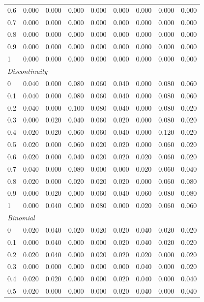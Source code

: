 \begin{table}[htbp]
\begin{tabular}{lcccccccc}
0.6 & 0.000 & 0.000 & 0.000 & 0.000 & 0.000 & 0.000 & 0.000 & 0.000 \\
0.7 & 0.000 & 0.000 & 0.000 & 0.000 & 0.000 & 0.000 & 0.000 & 0.000 \\
0.8 & 0.000 & 0.000 & 0.000 & 0.000 & 0.000 & 0.000 & 0.000 & 0.000 \\
0.9 & 0.000 & 0.000 & 0.000 & 0.000 & 0.000 & 0.000 & 0.000 & 0.000 \\
1 & 0.000 & 0.000 & 0.000 & 0.000 & 0.000 & 0.000 & 0.000 & 0.000 \\
\midrule
\multicolumn{9}{l}{\textit{Discontinuity}} \\
0 & 0.040 & 0.000 & 0.080 & 0.060 & 0.040 & 0.000 & 0.080 & 0.060 \\
0.1 & 0.040 & 0.000 & 0.080 & 0.060 & 0.040 & 0.000 & 0.080 & 0.060 \\
0.2 & 0.040 & 0.000 & 0.100 & 0.080 & 0.040 & 0.000 & 0.080 & 0.020 \\
0.3 & 0.000 & 0.020 & 0.040 & 0.060 & 0.020 & 0.000 & 0.080 & 0.020 \\
0.4 & 0.020 & 0.020 & 0.060 & 0.060 & 0.040 & 0.000 & 0.120 & 0.020 \\
0.5 & 0.020 & 0.000 & 0.060 & 0.020 & 0.020 & 0.000 & 0.060 & 0.020 \\
0.6 & 0.020 & 0.000 & 0.040 & 0.020 & 0.020 & 0.020 & 0.060 & 0.020 \\
0.7 & 0.040 & 0.000 & 0.080 & 0.000 & 0.000 & 0.020 & 0.060 & 0.040 \\
0.8 & 0.020 & 0.000 & 0.020 & 0.020 & 0.020 & 0.000 & 0.060 & 0.080 \\
0.9 & 0.000 & 0.020 & 0.000 & 0.060 & 0.040 & 0.060 & 0.080 & 0.080 \\
1 & 0.000 & 0.040 & 0.000 & 0.080 & 0.000 & 0.020 & 0.060 & 0.060 \\
\midrule
\multicolumn{9}{l}{\textit{Binomial}} \\
0 & 0.020 & 0.040 & 0.020 & 0.020 & 0.020 & 0.040 & 0.020 & 0.020 \\
0.1 & 0.000 & 0.040 & 0.000 & 0.000 & 0.020 & 0.040 & 0.020 & 0.020 \\
0.2 & 0.020 & 0.040 & 0.000 & 0.020 & 0.020 & 0.020 & 0.000 & 0.020 \\
0.3 & 0.000 & 0.000 & 0.000 & 0.000 & 0.000 & 0.040 & 0.000 & 0.020 \\
0.4 & 0.020 & 0.020 & 0.000 & 0.000 & 0.020 & 0.040 & 0.000 & 0.040 \\
0.5 & 0.020 & 0.000 & 0.000 & 0.000 & 0.020 & 0.040 & 0.000 & 0.040 \\

\end{tabular}
\end{table}
